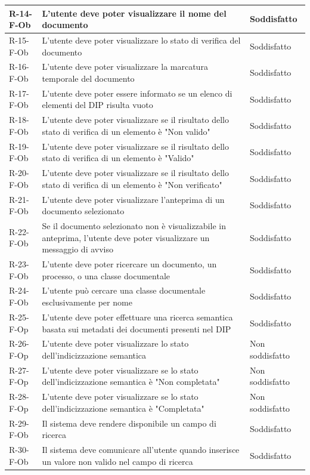 \begin{longtable}{|p{2.5cm}|p{9.5cm}|p{2.5cm}|}
R-14-F-Ob & L'utente deve poter visualizzare il nome del documento & Soddisfatto \\
\hline
R-15-F-Ob & L'utente deve poter visualizzare lo stato di verifica del documento & Soddisfatto \\
\hline
R-16-F-Ob & L'utente deve poter visualizzare la marcatura temporale del documento & Soddisfatto \\
\hline
R-17-F-Ob & L'utente deve poter essere informato se un elenco di elementi del DIP risulta vuoto & Soddisfatto \\
\hline
R-18-F-Ob & L'utente deve poter visualizzare se il risultato dello stato di verifica di un elemento è "Non valido" & Soddisfatto \\
\hline
R-19-F-Ob & L'utente deve poter visualizzare se il risultato dello stato di verifica di un elemento è "Valido" & Soddisfatto \\
\hline
R-20-F-Ob & L'utente deve poter visualizzare se il risultato dello stato di verifica di un elemento è "Non verificato" & Soddisfatto \\
\hline
R-21-F-Ob & L'utente deve poter visualizzare l'anteprima di un documento selezionato & Soddisfatto \\
\hline
R-22-F-Ob & Se il documento selezionato non è visualizzabile in anteprima, l'utente deve poter visualizzare un messaggio di avviso & Soddisfatto \\
\hline
R-23-F-Ob & L'utente deve poter ricercare un documento, un processo, o una classe documentale & Soddisfatto \\
\hline
R-24-F-Ob & L'utente può cercare una classe documentale esclusivamente per nome & Soddisfatto \\
\hline
R-25-F-Op & L'utente deve poter effettuare una ricerca semantica basata sui metadati dei documenti presenti nel DIP & Soddisfatto \\
\hline
R-26-F-Op & L'utente deve poter visualizzare lo stato dell'indicizzazione semantica & Non soddisfatto \\
\hline
R-27-F-Op & L'utente deve poter visualizzare se lo stato dell'indicizzazione semantica è "Non completata" & Non soddisfatto \\
\hline
R-28-F-Op & L'utente deve poter visualizzare se lo stato dell'indicizzazione semantica è "Completata" & Non soddisfatto \\
\hline
R-29-F-Ob & Il sistema deve rendere disponibile un campo di ricerca & Soddisfatto \\
\hline
R-30-F-Ob & Il sistema deve comunicare all'utente quando inserisce un valore non valido nel campo di ricerca & Soddisfatto \\

\end{longtable}
